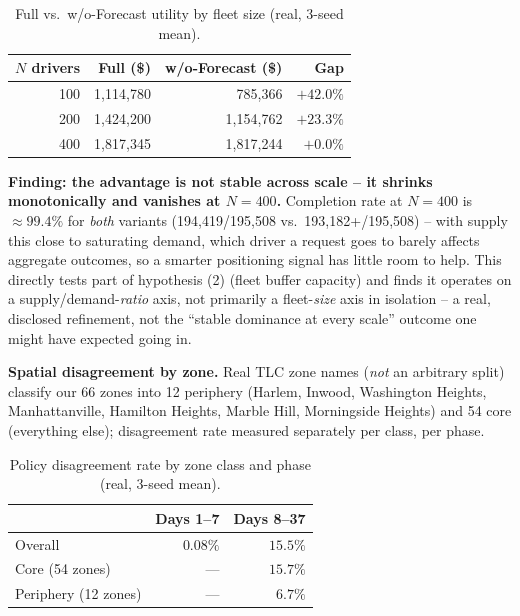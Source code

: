 \documentclass[10pt,twocolumn,a4paper]{article}
\begin{document}
\begin{table}[h!]
\centering
\caption{Full vs.\ w/o-Forecast utility by fleet size (real, 3-seed mean).}
\label{tab:fleetscale}
\footnotesize
\begin{tabular}{@{}rrrr@{}}
\toprule
$N$ drivers & Full (\$) & w/o-Forecast (\$) & Gap \\
\midrule
100 & 1{,}114{,}780 & 785{,}366 & $+42.0\%$ \\
200 & 1{,}424{,}200 & 1{,}154{,}762 & $+23.3\%$ \\
400 & 1{,}817{,}345 & 1{,}817{,}244 & $+0.0\%$ \\
\bottomrule
\end{tabular}
\end{table}

\textbf{Finding: the advantage is not stable across scale -- it shrinks
monotonically and vanishes at $N=400$.} Completion rate at $N=400$ is
$\approx99.4\%$ for \emph{both} variants (194{,}419/195{,}508 vs.\
193{,}182+/195{,}508) -- with supply this close to saturating demand, which
driver a request goes to barely affects aggregate outcomes, so a smarter
positioning signal has little room to help. This directly tests part of
hypothesis (2) (fleet buffer capacity) and finds it operates on a
supply/demand-\emph{ratio} axis, not primarily a fleet-\emph{size} axis in
isolation -- a real, disclosed refinement, not the ``stable dominance at
every scale'' outcome one might have expected going in.

\textbf{Spatial disagreement by zone.} Real TLC zone names (\emph{not} an
arbitrary split) classify our 66 zones into 12 periphery (Harlem, Inwood,
Washington Heights, Manhattanville, Hamilton Heights, Marble Hill,
Morningside Heights) and 54 core (everything else); disagreement rate
measured separately per class, per phase.

\begin{table}[h!]
\centering
\caption{Policy disagreement rate by zone class and phase (real, 3-seed mean).}
\label{tab:spatial}
\footnotesize
\begin{tabular}{@{}lrr@{}}
\toprule
& Days 1--7 & Days 8--37 \\
\midrule
Overall & $0.08\%$ & $15.5\%$ \\
Core (54 zones) & --- & $15.7\%$ \\
Periphery (12 zones) & --- & $6.7\%$ \\
\bottomrule
\end{tabular}
\end{table}
\end{document}

